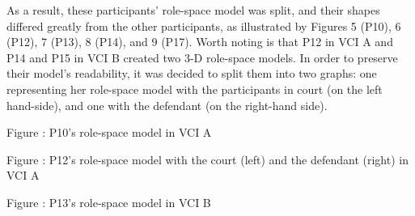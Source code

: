 \documentclass[output=paper]{langsci/langscibook}
\begin{document}
As a result, these participants’ role-space model was split, and their shapes differed greatly from the other participants, as illustrated by Figures 5 (P10), 6 (P12), 7 (P13), 8 (P14), and 9 (P17). Worth noting is that P12 in VCI A and P14 and P15 in VCI B created two 3-D role-space models. In order to preserve their model’s readability, it was decided to split them into two graphs: one representing her role-space model with the participants in court (on the left hand-side), and one with the defendant (on the right-hand side).

  
 

\begin{stylecaption}
Figure : P10's role-space model in VCI A
\end{stylecaption}

\begin{stylecaption}
  
   
 
\end{stylecaption}

\begin{stylecaption}
Figure : P12’s role-space model with the court (left) and the defendant (right) in VCI A
\end{stylecaption}

  
 

\begin{stylecaption}
Figure : P13's role-space model in VCI B
\end{stylecaption}

\begin{stylecaption}
  
   
 
\end{stylecaption}
\end{document}
